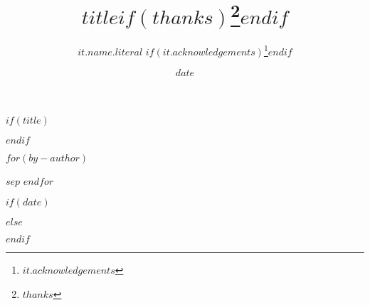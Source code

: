 $if(title)$
\title{$title$$if(thanks)$\thanks{$thanks$}$endif$}
$endif$

$for(by-author)$
\author{$it.name.literal$ 
$if(it.acknowledgements)$\thanks{$it.acknowledgements$}$endif$} 

$sep$
$endfor$

$if(date)$
\date{$date$}
$else$
\date{} %
$endif$


